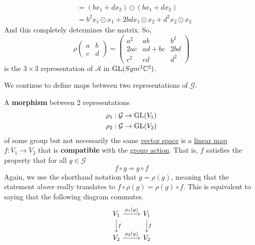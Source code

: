 \begin{example}
\begin{align*}
      & = (b x_1 + d x_2) \odot (b x_1 + d x_2) \\
      & = b^2 x_1 \odot x_1 + 2bd x_1 \odot x_2 + d^2 x_2 \odot x_2
    \end{align*}
    And this completely determines the matrix. So, 
    \begin{equation}
      \rho \begin{pmatrix}
      a&b\\c&d
      \end{pmatrix} = \begin{pmatrix}
      a^2&ab&b^2\\2ac&ad+bc&2bd\\c^2&cd&d^2
      \end{pmatrix}
    \end{equation}
    is the $3 \times 3$ representation of $\mathcal{A}$ in $\operatorname{GL}(Sym^2 \mathbb{C}^2)$. 
  \end{example}

  We continue to define maps between two representations of $\mathcal{G}$. 

  \begin{definition}
    \label{def:morphism-of-representations}
    A \textbf{morphism} between 2 representations 
    \begin{align*}
      & \rho_1: \mathcal{G} \to \operatorname{GL}(V_1) \\
      & \rho_2: \mathcal{G} \to \operatorname{GL}(V_2) 
    \end{align*}
    of some group but not necessarily the same \hyperref[lin-def:vector-space]{vector space} is a \hyperref[lin-def:linear_map]{linear map} $f: V_1 \to V_2$ that is \textbf{compatible} with the \hyperref[alg-def:group-action]{group action}. That is, $f$ satisfies the property that for all $g \in \mathcal{G}$
    \begin{equation}
      f \circ g = g \circ f
    \end{equation}
    Again, we use the shorthand notation that $g = \rho(g)$, meaning that the statement above really translates to $ f \circ \rho(g) = \rho(g) \circ f$. This is equivalent to saying that the following diagram commutes. 
    \begin{equation}
      \begin{tikzcd}
          V_1 \arrow{r}{\rho_1(g)} \arrow{d}{f} & V_1 \arrow{d}{f} \\
          V_2 \arrow{r}{\rho_2 (g)} & V_2
          \end{tikzcd}
    \end{equation}
  \end{definition}

